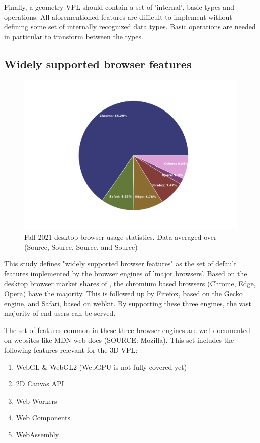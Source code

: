 Finally, a geometry VPL should contain a set of 'internal', basic types and operations.
All aforementioned features are difficult to implement without defining some set of internally recognized data types. 
Basic operations are needed in particular to transform between the types.


\subsection{Widely supported browser features}

\begin{figure}
  \centering
  \graphicspath{ {../../assets/plots/browser-usage/} }
  \includegraphics[width=0.7\linewidth]{plot.png}
  \caption[Browser usage]{Fall 2021 desktop browser usage statistics. Data averaged over (Source, Source, Source, and Source)}
  \label{fig:browser-usage}
\end{figure}

This study defines "widely supported browser features" as the set of default features implemented by the browser engines of 'major browsers'. 
Based on the desktop browser market shares of , the chromium based browsers (Chrome, Edge, Opera) have the majority. 
This is followed up by Firefox, based on the Gecko engine, and Safari, based on webkit. 
By supporting these three engines, the vast majority of end-users can be served.

The set of features common in these three browser engines are well-documented on websites like MDN web docs (SOURCE: Mozilla). 
This set includes the following features relevant for the 3D VPL:
\begin{enumerate}[-]
  \item WebGL \& WebGL2 (WebGPU is not fully covered yet)
  \item 2D Canvas API
  \item Web Workers
  \item Web Components
  \item WebAssembly
\end{enumerate}


